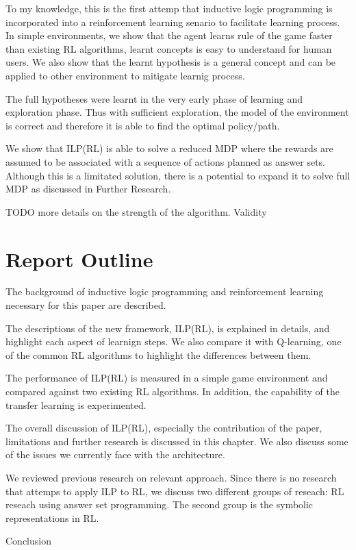 To my knowledge, this is the first attemp that inductive logic programming is incorporated into a reinforcement learning senario to facilitate learning process.
In simple environments, we show that the agent learns rule of the game faster than existing RL algorithms, learnt concepts is easy to understand for human users.
We also show that the learnt hypothesis is a general concept and can be applied to other environment to mitigate learnig process.

The full hypotheses were learnt in the very early phase of learning and exploration phase. Thus with sufficient exploration, the model of the environment is correct
and therefore it is able to find the optimal policy/path. 

We show that ILP(RL) is able to solve a reduced MDP where the rewards are assumed to be associated with a sequence of actions planned as answer sets.
Although this is a limitated solution, there is a potential to expand it to solve full MDP as discussed in Further Research. 

TODO more details on the strength of the algorithm. 
Validity


\section{Report Outline}
\begin{customthm}{2}
The background of inductive logic programming and reinforcement learning necessary for this paper are described.
\end{customthm}

\begin{customthm}{3}
The descriptions of the new framework, ILP(RL), is explained in details, and highlight each aspect of learnign steps. We also compare it with Q-learning, one of the common RL algorithms to highlight the differences between them. 
\end{customthm}

\begin{customthm}{4}
The performance of ILP(RL) is measured in a simple game environment and compared against two existing RL algorithms. In addition, the capability of the transfer learning is experimented.
\end{customthm}

\begin{customthm}{5}
The overall discussion of ILP(RL), especially the contribution of the paper, limitations and further research is discussed in this chapter.
We also discuss some of the issues we currently face with the architecture. 
\end{customthm}

\begin{customthm}{6}
We reviewed previous research on relevant approach. Since there is no research that attemps to apply ILP to RL, we discuss two different groups of reseach: 
RL reseach using answer set programming. The second group is the symbolic representations in RL.  
\end{customthm}

\begin{customthm}{7}
Conclusion
\end{customthm}